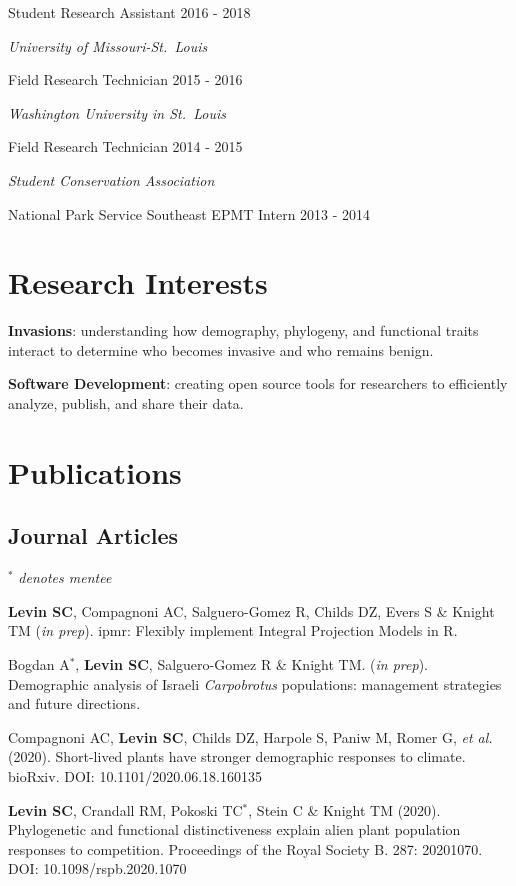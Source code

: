 \documentclass[11pt,]{article}
\begin{document}
Student Research Assistant \hfill 2016 - 2018

\emph{University of Missouri-St.~Louis}

Field Research Technician \hfill 2015 - 2016

\emph{Washington University in St.~Louis}

Field Research Technician \hfill 2014 - 2015

\emph{Student Conservation Association}

National Park Service Southeast EPMT Intern \hfill 2013 - 2014

\hypertarget{research-interests}{%
\section{Research Interests}\label{research-interests}}

\textbf{Invasions}: understanding how demography, phylogeny, and
functional traits interact to determine who becomes invasive and who
remains benign.

\textbf{Software Development}: creating open source tools for
researchers to efficiently analyze, publish, and share their data.

\hypertarget{publications}{%
\section{Publications}\label{publications}}

\hypertarget{journal-articles}{%
\subsection{Journal Articles}\label{journal-articles}}

\(^\ast\) \emph{denotes mentee}

\textbf{Levin SC}, Compagnoni AC, Salguero-Gomez R, Childs DZ, Evers S
\& Knight TM (\emph{in prep}). ipmr: Flexibly implement Integral
Projection Models in R.

Bogdan A\(^\ast\), \textbf{Levin SC}, Salguero-Gomez R \& Knight TM.
(\emph{in prep}). Demographic analysis of Israeli \emph{Carpobrotus}
populations: management strategies and future directions.

Compagnoni AC, \textbf{Levin SC}, Childs DZ, Harpole S, Paniw M, Romer
G, \emph{et al.} (2020). Short-lived plants have stronger demographic
responses to climate. bioRxiv. DOI: 10.1101/2020.06.18.160135

\textbf{Levin SC}, Crandall RM, Pokoski TC\(^\ast\), Stein C \& Knight
TM (2020). Phylogenetic and functional distinctiveness explain alien
plant population responses to competition. Proceedings of the Royal
Society B. 287: 20201070. DOI: 10.1098/rspb.2020.1070
\end{document}
